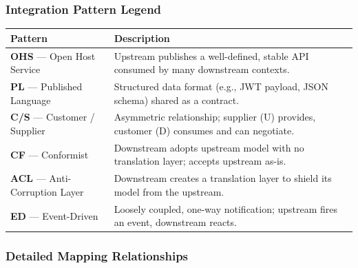 \documentclass[12pt,a4paper]{article}
\begin{document}
\subsubsection*{Integration Pattern Legend}

\begin{center}
\begin{tabular}{@{}lp{10cm}@{}}
\toprule
\textbf{Pattern} & \textbf{Description} \\
\midrule
\textbf{OHS} — Open Host Service & Upstream publishes a well-defined, stable API consumed by many downstream contexts. \\
\textbf{PL} — Published Language & Structured data format (e.g., JWT payload, JSON schema) shared as a contract. \\
\textbf{C/S} — Customer / Supplier & Asymmetric relationship; supplier (U) provides, customer (D) consumes and can negotiate. \\
\textbf{CF} — Conformist & Downstream adopts upstream model with no translation layer; accepts upstream as-is. \\
\textbf{ACL} — Anti-Corruption Layer & Downstream creates a translation layer to shield its model from the upstream. \\
\textbf{ED} — Event-Driven & Loosely coupled, one-way notification; upstream fires an event, downstream reacts. \\
\bottomrule
\end{tabular}
\end{center}

\vspace{0.8em}

\subsubsection*{Detailed Mapping Relationships}
\end{document}
